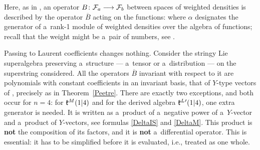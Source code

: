 \documentclass[12pt,a4paper]{amsart}
\theoremstyle{thm}
\theoremstyle{definition}
\begin{document}
Here, as in \cite{BLS1}, an operator $B\colon{\mathcal F}_a\longrightarrow{\mathcal F}_b$ between spaces of weighted densities is described by the operator $\overline B$ acting on the functions:
\be\label{barB}
\ee
where $\alpha$ designates the generator of a~rank-1 module of weighted densities over the algebra of functions; recall that the weight might be a~pair of numbers, see \cite{BLS1}.

Passing to Laurent coefficients changes nothing. Consider the stringy Lie superalgebra preserving a~structure --- a~tensor or a~distribution --- on the superstring considered. All the operators $\overline B$ invariant with respect to it are polynomials with constant coefficients in an invariant basis, that of $Y$-type vectors of \cite{Sh}, precisely as in Theorem~\ref{Peetre}. There are exactly two exceptions, and both occur for $n=4$: for ${\mathfrak{k}}^{M}(1|4)$ and for the derived algebra ${\mathfrak{k}}^{L}{}'(1|4)$, one extra generator is needed. It is written as a~product of a~negative power of a~$Y$-vector and a~product of $Y$-vectors, see formulas \eqref{DeltaIS} and \eqref{DeltaM}. This product is \textbf{not} the composition of its factors, and it is \textbf{not} a~differential operator. 
This is essential: it has to be simplified before it is evaluated, i.e., treated as one whole.
\end{document}
